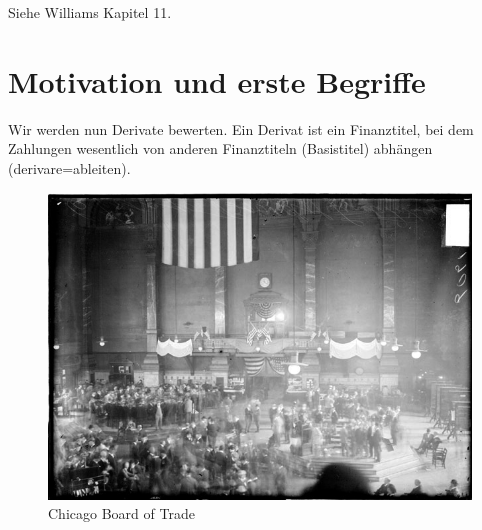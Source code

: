 \documentclass[a4paper,twoside,DIV15,BCOR12mm]{scrbook}
\begin{document}
\begin{beweis}
Siehe Williams Kapitel 11.
\end{beweis}

\section{Motivation und erste Begriffe}
Wir werden nun Derivate bewerten. Ein Derivat ist ein Finanztitel, bei dem Zahlungen wesentlich von anderen Finanztiteln (Basistitel) abhängen (derivare=ableiten).

\begin{figure}
\begin{center}
\includegraphics[width=0.9\linewidth]{CBOT}
\end{center}
\caption{Chicago Board of Trade}
\end{figure}
\end{document}
